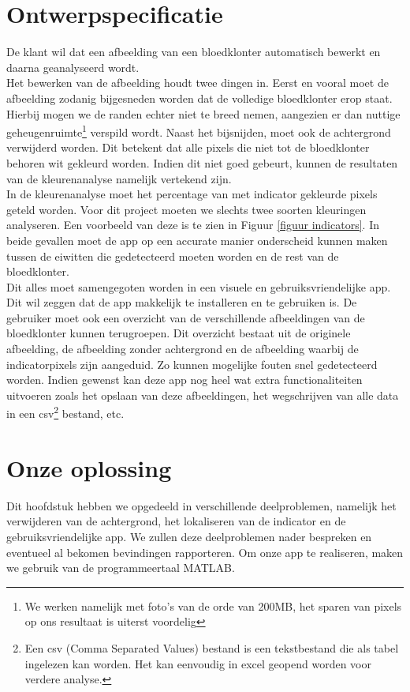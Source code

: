\documentclass[a4paper,kulak]{kulakarticle}
\begin{document}
	\section{Ontwerpspecificatie}
		De klant wil dat een afbeelding van een bloedklonter automatisch bewerkt en daarna geanalyseerd wordt.\\
		Het bewerken van de afbeelding houdt twee dingen in. Eerst en vooral moet de afbeelding zodanig bijgesneden worden dat de volledige bloedklonter erop staat. Hierbij mogen we de randen echter niet te breed nemen, aangezien er dan nuttige geheugenruimte\footnote{We werken namelijk met foto's van de orde van 200MB, het sparen van pixels op ons resultaat is uiterst voordelig} verspild wordt. 
		Naast het bijsnijden, moet ook de achtergrond verwijderd worden. Dit betekent dat alle pixels die niet tot de bloedklonter behoren wit gekleurd worden. Indien dit niet goed gebeurt, kunnen de resultaten van de kleurenanalyse namelijk vertekend zijn.\\
		In de kleurenanalyse moet het percentage van met indicator gekleurde pixels geteld worden. Voor dit project moeten we slechts twee soorten kleuringen analyseren. Een voorbeeld van deze is te zien in Figuur \ref{figuur indicators}. In beide gevallen moet de app op een accurate manier onderscheid kunnen maken tussen de eiwitten die gedetecteerd moeten worden en de rest van de bloedklonter. \\
		Dit alles moet samengegoten worden in een visuele en gebruiksvriendelijke app. Dit wil zeggen dat de app makkelijk te installeren en te gebruiken is. De gebruiker moet ook een overzicht van de verschillende afbeeldingen van de bloedklonter kunnen terugroepen. Dit overzicht bestaat uit de originele afbeelding, de afbeelding zonder achtergrond en de afbeelding waarbij de indicatorpixels zijn aangeduid. Zo kunnen mogelijke fouten snel gedetecteerd worden. Indien gewenst kan deze app nog heel wat extra functionaliteiten uitvoeren zoals het opslaan van deze afbeeldingen, het wegschrijven van alle data in een csv\footnote{Een csv (Comma Separated Values) bestand is een tekstbestand die als tabel ingelezen kan worden. Het kan eenvoudig in excel geopend worden voor verdere analyse.} bestand, etc.
	
	\section{Onze oplossing}
		Dit hoofdstuk hebben we opgedeeld in verschillende deelproblemen, namelijk het verwijderen van de achtergrond, het lokaliseren van de indicator en de gebruiksvriendelijke app. We zullen deze deelproblemen nader bespreken en eventueel al bekomen bevindingen rapporteren. Om onze app te realiseren, maken we gebruik van de programmeertaal MATLAB.
\end{document}
